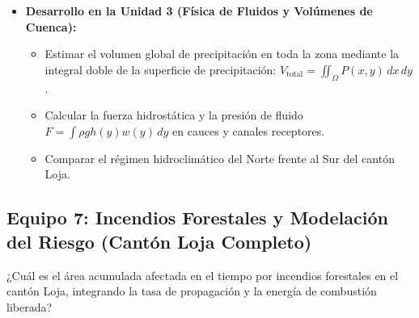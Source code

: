 \documentclass[11pt,a4paper]{article}
\begin{document}
\begin{itemize}[leftmargin=*,itemsep=1.5pt]
  \item \textbf{Desarrollo en la Unidad 3 (Física de Fluidos y Volúmenes de Cuenca):}
  \begin{itemize}
    \item Estimar el volumen global de precipitación en toda la zona mediante la integral doble de la superficie de precipitación: $V_{\text{total}} = \iint_{\Omega} P(x,y)\,dx\,dy$.
    \item Calcular la fuerza hidrostática y la presión de fluido $F = \int \rho g h(y) w(y)\,dy$ en cauces y canales receptores.
    \item Comparar el régimen hidroclimático del Norte frente al Sur del cantón Loja.
  \end{itemize}
\end{itemize}

\subsection{Equipo 7: Incendios Forestales y Modelación del Riesgo (Cantón Loja Completo)}
\begin{guidelinebox}[title=Pregunta Guía Central]
¿Cuál es el área acumulada afectada en el tiempo por incendios forestales en el cantón Loja, integrando la tasa de propagación y la energía de combustión liberada?
\end{guidelinebox}
\end{document}
